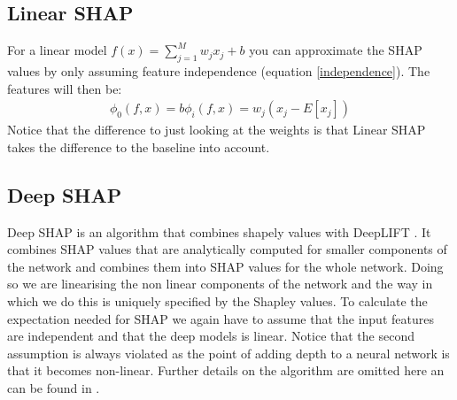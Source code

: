 \documentclass[conference]{IEEEtran}
\begin{document}
\subsection{Linear SHAP}
For a linear model $f(x) = \sum_{j=1}^M w_j x_j + b$ you can approximate the SHAP values by only assuming feature independence (equation \ref{independence}).
The features will then be:
\begin{align}
\phi_0(f,x) = b
\phi_i(f,x) = w_j(x_j - E[x_j]) 
\end{align}
Notice that the difference to just looking at the weights is that Linear SHAP takes the difference to the baseline into account.

\subsection{Deep SHAP}
Deep SHAP \cite{b2} is an algorithm that combines shapely values with DeepLIFT \cite{b5}.
It combines SHAP values that are analytically computed for smaller components of the network and combines them into SHAP values for the whole network. Doing so we are linearising the non linear components of the network and the way in which we do this is uniquely specified by the Shapley values.
To calculate the expectation needed for SHAP we again have to assume that the input features are independent and that the deep models is linear. 
Notice that the second assumption is always violated as the point of adding depth to a neural network is that it becomes non-linear.
Further details on the algorithm are omitted here an can be found in \cite{b2}.
\end{document}
